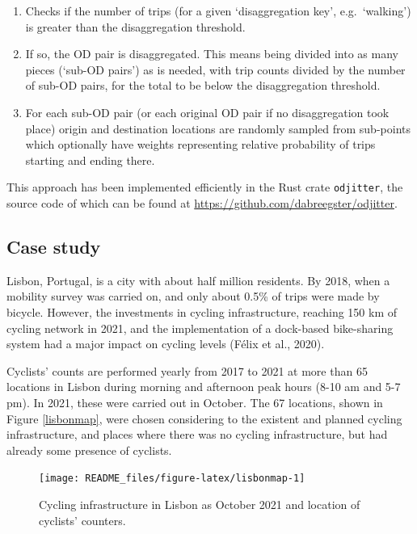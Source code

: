 \documentclass{isprs} %
\providecommand{\tightlist}{%
  \setlength{\itemsep}{0pt}\setlength{\parskip}{0pt}}
\begin{document}
\begin{enumerate}
\def\labelenumi{\arabic{enumi}.}
\tightlist
\item
  Checks if the number of trips (for a given `disaggregation key', e.g.~`walking') is greater than the disaggregation threshold.
\item
  If so, the OD pair is disaggregated. This means being divided into as many pieces (`sub-OD pairs') as is needed, with trip counts divided by the number of sub-OD pairs, for the total to be below the disaggregation threshold.
\item
  For each sub-OD pair (or each original OD pair if no disaggregation took place) origin and destination locations are randomly sampled from sub-points which optionally have weights representing relative probability of trips starting and ending there.
\end{enumerate}

This approach has been implemented efficiently in the Rust crate \texttt{odjitter}, the source code of which can be found at \url{https://github.com/dabreegster/odjitter}.

\hypertarget{case-study}{%
\subsection{Case study}\label{case-study}}

Lisbon, Portugal, is a city with about half million residents. By 2018, when a mobility survey was carried on, and only about 0.5\% of trips were made by bicycle. However, the investments in cycling infrastructure, reaching 150 km of cycling network in 2021, and the implementation of a dock-based bike-sharing system had a major impact on cycling levels (Félix et al., 2020).

Cyclists' counts are performed yearly from 2017 to 2021 at more than 65 locations in Lisbon during morning and afternoon peak hours (8-10 am and 5-7 pm). In 2021, these were carried out in October.
The 67 locations, shown in Figure \ref{lisbonmap}, were chosen considering to the existent and planned
cycling infrastructure, and places where there was no cycling infrastructure, but had already some presence
of cyclists.

\begin{figure}

{\centering \texttt{[image: README\_files/figure-latex/lisbonmap-1]} 

}

\caption{\label{lisbonmap}Cycling infrastructure in Lisbon as October 2021 and location of cyclists' counters.}\label{fig:lisbonmap}
\end{figure}
\end{document}
